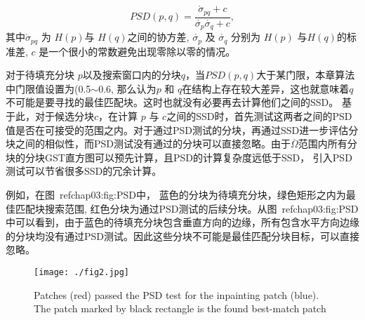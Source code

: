  $$PSD(p,q)=\frac{\acute{\sigma}_{pq}+c}{\acute{\sigma_p}\acute{\sigma_q}+c},$$
其中\(\acute{\sigma}_{pq}\) 为 \(H(p)\)与 \(H(q)\)之间的协方差, \(\acute{\sigma_p}\) 及 \(\acute{\sigma_q}\) 分别为 \(H(p)\) 与\(H(q)\)的标准差, \(c\) 是一个很小的常数避免出现零除以零的情况。\par
 对于待填充分块 \(p\)以及搜索窗口内的分块\(q\)，当\(PSD(p,q)\)大于某门限，本章算法中门限值设置为(0.5\(\sim\)0.6, 那么认为\(p\) 和 \(q\)在结构上存在较大差异，这也就意味着\(q\) 不可能是要寻找的最佳匹配块。这时也就没有必要再去计算他们之间的SSD。 基于此，对于候选分块\(c\)，在计算 \(p\) 与 \(c\)之间的SSD时，首先测试这两者之间的PSD值是否在可接受的范围之内。对于通过PSD测试的分块，再通过SSD进一步评估分块之间的相似性，而PSD测试没有通过的分块可以直接忽略。由于\(\overline{\Omega}\)范围内所有分块的分块GST直方图可以预先计算，且PSD的计算复杂度远低于SSD， 引入PSD测试可以节省很多SSD的冗余计算。\par
例如，在图~ref{chap03:fig:PSD}中， 蓝色的分块为待填充分块，绿色矩形之内为最佳匹配块搜索范围, 红色分块为通过PSD测试的后续分块。从图~ref{chap03:fig:PSD}中可以看到，由于蓝色的待填充分块包含垂直方向的边缘，所有包含水平方向边缘的分块均没有通过PSD测试。因此这些分块不可能是最佳匹配分块目标，可以直接忽略。
 \begin{figure}[!htbp]
 	\begin{center}
 			\texttt{[image: ./fig2.jpg]}
 	\end{center}
     \caption{Patches (red) passed the PSD test for the inpainting patch (blue). The patch marked by black rectangle is the found best-match patch}
 	\label{chap03:fig:PSD}
 \end{figure}


